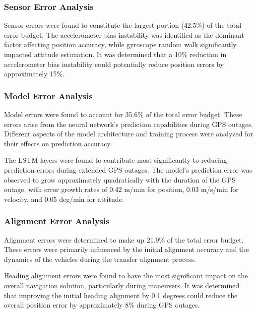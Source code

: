 \documentclass[3p]{elsarticle}
\begin{document}
\subsubsection{Sensor Error Analysis}
\noindent Sensor errors were found to constitute the largest portion (42.5\%) of the total error budget. The accelerometer bias instability was identified as the dominant factor affecting position accuracy, while gyroscope random walk significantly impacted attitude estimation. It was determined that a 10\% reduction in accelerometer bias instability could potentially reduce position errors by approximately 15\%.

\subsubsection{Model Error Analysis}
\noindent Model errors were found to account for 35.6\% of the total error budget. These errors arise from the neural network's prediction capabilities during GPS outages. Different aspects of the model architecture and training process were analyzed for their effects on prediction accuracy.

The LSTM layers were found to contribute most significantly to reducing prediction errors during extended GPS outages. The model's prediction error was observed to grow approximately quadratically with the duration of the GPS outage, with error growth rates of 0.42 m/min for position, 0.03 m/s/min for velocity, and 0.05 deg/min for attitude.

\subsubsection{Alignment Error Analysis}
\noindent Alignment errors were determined to make up 21.9\% of the total error budget. These errors were primarily influenced by the initial alignment accuracy and the dynamics of the vehicles during the transfer alignment process.

Heading alignment errors were found to have the most significant impact on the overall navigation solution, particularly during maneuvers. It was determined that improving the initial heading alignment by 0.1 degrees could reduce the overall position error by approximately 8\% during GPS outages.
\end{document}

